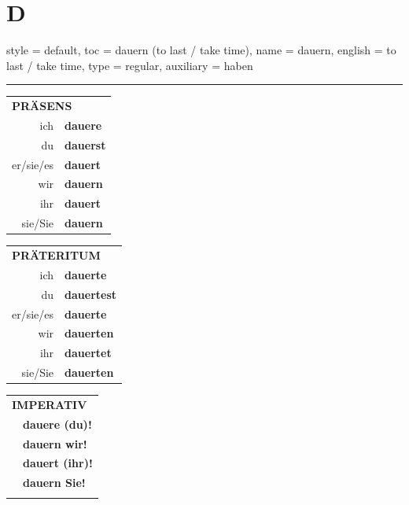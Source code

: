 \section{D}

\begin{verbentry}{
  style = {default},
  toc = {dauern (to last / take time)},
  name = {dauern},
  english = {to last / take time},
  type = {regular},
  auxiliary = {haben}
}
 
    
     \vspace{5pt}

    \hrule
    
    \vspace{5pt}

  \begin{tabular}{rl}
     \multicolumn{2}{l}{\textbf{PRÄSENS} }\\
    ich & \textbf{dauere}\\
    du & \textbf{dauerst}\\
    er/sie/es & \textbf{dauert}\\
    wir & \textbf{dauern}\\
    ihr & \textbf{dauert}\\
    sie/Sie & \textbf{dauern}\\
  \end{tabular}
  \hfill
     \begin{tabular}{rl}
    \multicolumn{2}{l}{\textbf{PRÄTERITUM} }\\
    ich & \textbf{dauerte}\\
    du & \textbf{dauertest}\\
    er/sie/es & \textbf{dauerte}\\
    wir & \textbf{dauerten}\\
    ihr & \textbf{dauertet}\\
    sie/Sie & \textbf{dauerten}\\
  \end{tabular}
  \hfill
  \begin{tabular}{rl}
     \multicolumn{2}{l}{\textbf{IMPERATIV} }\\
   & \textbf{dauere (du)!}\\
   & \textbf{dauern wir!}\\
   & \textbf{dauert (ihr)!}\\
   & \textbf{dauern Sie!}\\
   & \vspace{10pt}
  \end{tabular}


\end{verbentry}
